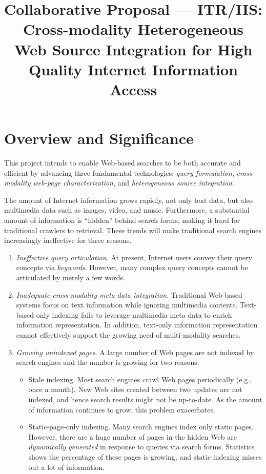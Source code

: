 \title{Collaborative Proposal --- ITR/IIS: Cross-modality Heterogeneous
Web Source Integration for High Quality Internet Information Access}

\section{Overview and Significance}
\label{sec-overview}

\newcommand{\jc}[1]{{\bf (** Junghoo ** }{#1}{\bf\ ** Junghoo **)~}}

This project intends to enable Web-based searches to be both 
accurate and efficient by advancing three fundamental technologies:
{\em query formulation}, {\em cross-modality web-page characterization},
and {\em heterogeneous source integration}.

The amount of Internet information grows rapidly, not only text data,
but also multimedia data such as images, video, and music. 
Furthermore, a substantial amount of information is ``hidden''
behind search forms, making it hard for traditional crawlers to
retrieval.  These trends will make traditional search engines 
increasingly ineffective for three reasons.

\begin{enumerate}

\item {\em Ineffective query articulation}. 
 At present, Internet users convey their
 query concepts via {\em keywords}.  However, many complex
 query concepts cannot be articulated by merely a few words.

\item {\em Inadequate cross-modality meta-data integration}.  
 Traditional Web-based systems focus on text
 information while ignoring multimedia contents.
 Text-based only indexing fails to leverage
 multimedia meta data to enrich information representation.
 In addition, text-only information representation
 cannot effectively support the growing need of multi-modality
 searches.  

\item {\em Growing unindexed pages}.
A large number of Web pages are not indexed by search engines and
the number is growing for two reasons.
\begin{itemize}
\item Stale indexing.  Most search engines crawl Web pages periodically 
  (e.g., once a month).  New Web sites created between two updates
  are not indexed, and hence search results might not be
  up-to-date.  As the amount of information continues to
  grow, this problem exacerbates.

\item Static-page-only indexing.   Many search engines index only static 
  pages.  However, there are a huge number of pages in the hidden Web
  \cite{} are {\em dynamically generated} in response to queries via
  search forms.  Statistics shows the percentage of these
  pages is growing, and static indexing misses out a lot of
  information.
\end{itemize}
\end{enumerate}

